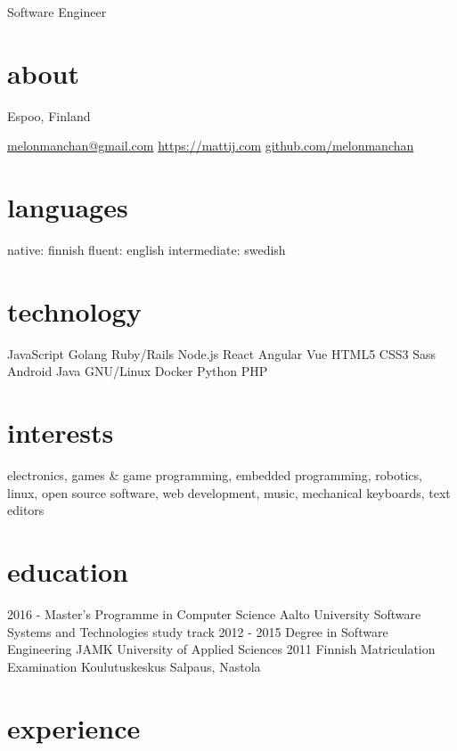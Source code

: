 \documentclass[]{friggeri-cv}
\begin{document}
       {Software Engineer}


\begin{aside}
  \section{about}
    Espoo,
    Finland
    
    \href{mailto:melonmanchan@gmail.com}{melonmanchan@gmail.com}
    \href{https://mattij.com/}{https://mattij.com}
    \href{github.com/melonmanchan}{github.com/melonmanchan}
  \section{languages}
    native: finnish
    fluent: english
    intermediate: swedish
  \section{technology}
    JavaScript
    Golang
    Ruby/Rails
    Node.js
    React
    Angular
    Vue
    HTML5
    CSS3
    Sass
    Android
    Java
    GNU/Linux
    Docker
    Python
    PHP
\end{aside}

\section{interests}

electronics, games \& game programming, embedded programming, robotics, linux, open source software, web development, music, mechanical keyboards, text editors

\section{education}

\begin{entrylist}
  \entry
    {2016 -}
    {Master's Programme in Computer Science}
    {Aalto University}
    {Software Systems and Technologies study track}
  \entry
    {2012 - 2015}
    {Degree in Software Engineering}
    {JAMK University of Applied Sciences}
    {}
  \entry
    {2011}
    {Finnish Matriculation Examination}
    {Koulutuskeskus Salpaus, Nastola}
    {}
\end{entrylist}

\section{experience}
\end{document}
